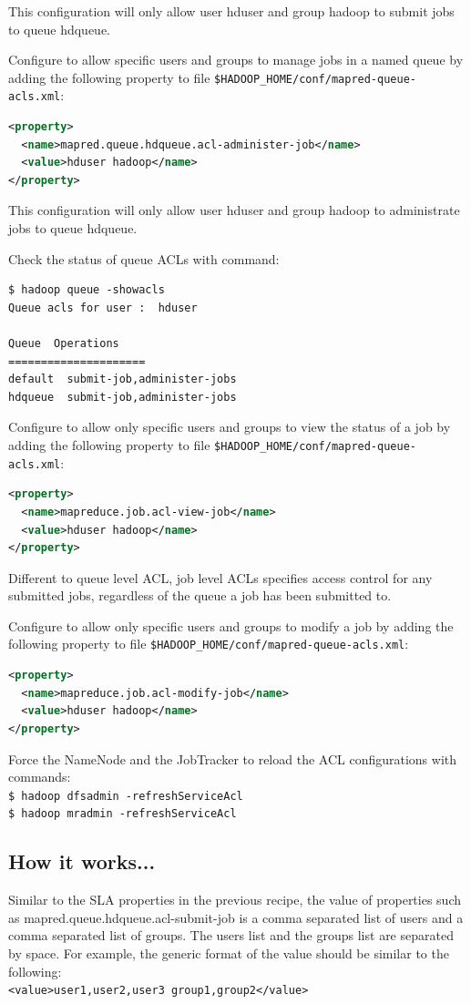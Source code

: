 This configuration will only allow user hduser and group hadoop to submit jobs to queue hdqueue.

Configure to allow specific users and groups to manage jobs in a named queue by adding the following property to file \verb|$HADOOP_HOME/conf/mapred-queue-acls.xml|:
\lstset{style=bashstyle}
\begin{lstlisting}[language=XML]
<property>
  <name>mapred.queue.hdqueue.acl-administer-job</name>
  <value>hduser hadoop</name>
</property>
\end{lstlisting}

This configuration will only allow user hduser and group hadoop to administrate jobs to queue hdqueue.

Check the status of queue ACLs with command:
\lstset{style=bashstyle}
\begin{lstlisting}
$ hadoop queue -showacls
Queue acls for user :  hduser

Queue  Operations
=====================
default  submit-job,administer-jobs
hdqueue  submit-job,administer-jobs
\end{lstlisting}

Configure to allow only specific users and groups to view the status of a job by adding the following property to file \verb|$HADOOP_HOME/conf/mapred-queue-acls.xml|:
\lstset{style=bashstyle}
\begin{lstlisting}[language=XML]
<property>
  <name>mapreduce.job.acl-view-job</name>
  <value>hduser hadoop</name>
</property>
\end{lstlisting}

Different to queue level ACL, job level ACLs specifies access control for any submitted jobs, regardless of the queue a job has been submitted to.

Configure to allow only specific users and groups to modify a job by adding the following property to file \verb|$HADOOP_HOME/conf/mapred-queue-acls.xml|:
\lstset{style=bashstyle}
\begin{lstlisting}[language=XML]
<property>
  <name>mapreduce.job.acl-modify-job</name>
  <value>hduser hadoop</name>
</property>
\end{lstlisting}

Force the NameNode and the JobTracker to reload the ACL configurations with commands: \\
\verb|$ hadoop dfsadmin -refreshServiceAcl| \\
\verb|$ hadoop mradmin -refreshServiceAcl|

\subsection*{How it works...}
Similar to the SLA properties in the previous recipe, the value of properties such as mapred.queue.hdqueue.acl-submit-job is a comma separated list of users and a comma separated list of groups. The users list and the groups list are separated by space. For example,  the generic format of the value should be similar to the following: \\
\verb|<value>user1,user2,user3 group1,group2</value>|


